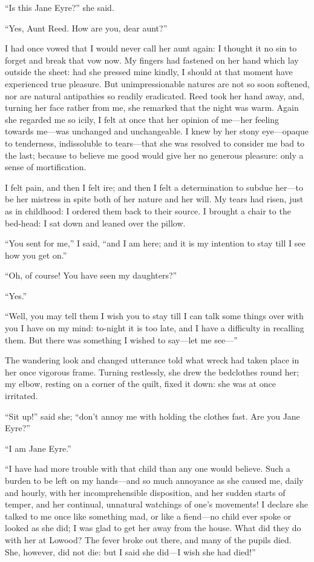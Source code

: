 \enquote{Is this Jane Eyre?} she said.

\enquote{Yes, Aunt Reed. How are you, dear aunt?}

I had once vowed that I would never call her aunt again: I thought it no
sin to forget and break that vow now. My fingers had fastened on her
hand which lay outside the sheet: had she pressed mine kindly, I should
at that moment have experienced true pleasure. But unimpressionable
natures are not so soon softened, nor are natural antipathies so readily
eradicated. \Mrs{} Reed took her hand away, and, turning her face rather
from me, she remarked that the night was warm. Again she regarded me so
icily, I felt at once that her opinion of me---her feeling towards
me---was unchanged and unchangeable. I knew by her stony eye---opaque
to tenderness, indissoluble to tears---that she was resolved to consider
me bad to the last; because to believe me good would give her no
generous pleasure: only a sense of mortification.

I felt pain, and then I felt ire; and then I felt a determination to
subdue her---to be her mistress in spite both of her nature and her
will. My tears had risen, just as in childhood: I ordered them back to
their source. I brought a chair to the bed-head: I sat down and leaned
over the pillow.

\enquote{You sent for me,} I said, \enquote{and I am here; and it is my
intention to stay till I see how you get on.}

\enquote{Oh, of course! You have seen my daughters?}

\enquote{Yes.}

\enquote{Well, you may tell them I wish you to stay till I can talk some
things over with you I have on my mind: to-night it is too late, and I
have a difficulty in recalling them. But there was something I wished
to say---let me see---}

The wandering look and changed utterance told what wreck had taken place
in her once vigorous frame. Turning restlessly, she drew the bedclothes
round her; my elbow, resting on a corner of the quilt, fixed it down:
she was at once irritated.

\enquote{Sit up!} said she; \enquote{don't annoy me with holding the
clothes fast. Are you Jane Eyre?}

\enquote{I am Jane Eyre.}

\enquote{I have had more trouble with that child than any one would
believe. Such a burden to be left on my hands---and so much annoyance
as she caused me, daily and hourly, with her incomprehensible
disposition, and her sudden starts of temper, and her continual,
unnatural watchings of one's movements! I declare she talked to me once
like something mad, or like a fiend---no child ever spoke or looked as
she did; I was glad to get her away from the house. What did they do
with her at Lowood? The fever broke out there, and many of the pupils
died. She, however, did not die: but I said she did---I wish she had
died!}

